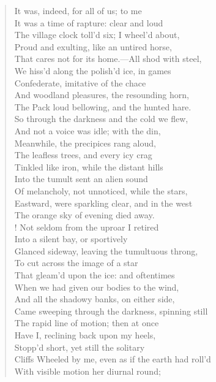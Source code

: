 \begin{verse}
It was, indeed, for all of us; to me  \\
It was a time of rapture: clear and loud	  \\
The village clock toll'd six; I wheel'd about,  \\
Proud and exulting, like an untired horse,  \\
That cares not for its home.---All shod with steel,  \\
We hiss'd along the polish'd ice, in games  \\
Confederate, imitative of the chace	  \\
And woodland pleasures, the resounding horn,  \\
The Pack loud bellowing, and the hunted hare.  \\
So through the darkness and the cold we flew,  \\
And not a voice was idle; with the din,  \\
Meanwhile, the precipices rang aloud,	  \\
The leafless trees, and every icy crag  \\
Tinkled like iron, while the distant hills  \\
Into the tumult sent an alien sound  \\
Of melancholy, not unnoticed, while the stars,  \\
Eastward, were sparkling clear, and in the west	  \\
The orange sky of evening died away.  \\!
Not seldom from the uproar I retired  \\
Into a silent bay, or sportively  \\
Glanced sideway, leaving the tumultuous throng,  \\
To cut across the image of a star	  \\
That gleam'd upon the ice: and oftentimes  \\
When we had given our bodies to the wind,  \\
And all the shadowy banks, on either side,  \\
Came sweeping through the darkness, spinning still  \\
The rapid line of motion; then at once	  \\
Have I, reclining back upon my heels,  \\
Stopp'd short, yet still the solitary  \\
Cliffs Wheeled by me, even as if the earth had roll'd  \\
With visible motion her diurnal round;  \\

\end{verse}
